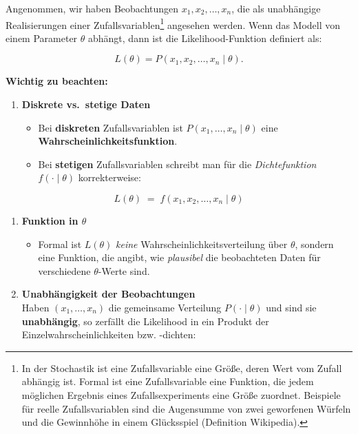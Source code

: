 \documentclass[
]{article}
\providecommand{\tightlist}{%
  \setlength{\itemsep}{0pt}\setlength{\parskip}{0pt}}
\begin{document}
Angenommen, wir haben Beobachtungen \(x_1, x_2, \dots, x_n\), die als unabhängige Realisierungen einer Zufallsvariablen\footnote{In der Stochastik ist eine Zufallsvariable eine Größe, deren Wert vom Zufall abhängig ist. Formal ist eine Zufallsvariable eine Funktion, die jedem möglichen Ergebnis eines Zufallsexperiments eine Größe zuordnet. Beispiele für reelle Zufallsvariablen sind die Augensumme von zwei geworfenen Würfeln und die Gewinnhöhe in einem Glücksspiel (Definition Wikipedia).} angesehen werden. Wenn das Modell von einem Parameter \(\theta\) abhängt, dann ist die Likelihood-Funktion definiert als:

\[L(\theta) = P(x_1, x_2, \dots, x_n \mid \theta).\]

\textbf{Wichtig zu beachten:}

\begin{enumerate}
\def\labelenumi{\arabic{enumi}.}
\tightlist
\item
  \textbf{Diskrete vs.~stetige Daten}

  \begin{itemize}
  \tightlist
  \item
    Bei \textbf{diskreten} Zufallsvariablen ist \(P(x_1, \dots, x_n\mid\theta)\) eine \textbf{Wahrscheinlichkeitsfunktion}.\\
  \item
    Bei \textbf{stetigen} Zufallsvariablen schreibt man für die \emph{Dichtefunktion} \(f(\cdot\mid\theta)\) korrekterweise:
  \end{itemize}
\end{enumerate}

\[L(\theta) \;=\; f(x_1, x_2, \dots, x_n \mid \theta)\]

\begin{enumerate}
\def\labelenumi{\arabic{enumi}.}
\setcounter{enumi}{1}
\tightlist
\item
  \textbf{Funktion in \(\theta\)}

  \begin{itemize}
  \tightlist
  \item
    Formal ist \(L(\theta)\) \emph{keine} Wahrscheinlichkeitsverteilung über \(\theta\), sondern eine Funktion, die angibt, wie \emph{plausibel} die beobachteten Daten für verschiedene \(\theta\)-Werte sind.
  \end{itemize}
\item
  \textbf{Unabhängigkeit der Beobachtungen}\\
  Haben \((x_1,\dots,x_n)\) die gemeinsame Verteilung \(P(\cdot\mid\theta)\) und sind sie \textbf{unabhängig}, so zerfällt die Likelihood in ein Produkt der Einzelwahrscheinlichkeiten bzw. -dichten:
\end{enumerate}
\end{document}
